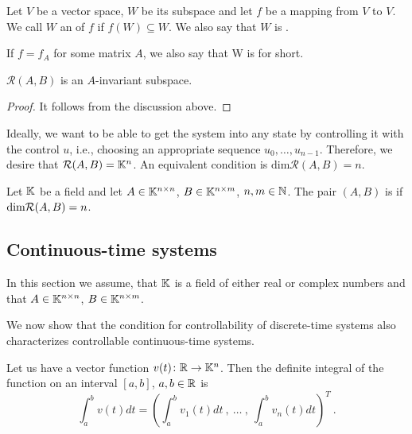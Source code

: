 \begin{definition}
	Let $V$ be a vector space, $W$ be its subspace and let $f$ be a mapping from $V$ to $V$. We call $W$ an  of $f$ if $f(W)\subseteq W$. We also say that $W$ is . 
	
	If $f=f_A$ for some matrix $A$, we also say that W is  for short.
\end{definition}

\begin{lemma}
	\label{lem:reachinv}
	$\mathcal{R}(A,B)$ is an $A$-invariant subspace.
\end{lemma} 

\begin{proof}
	It follows from the discussion above.
\end{proof}

Ideally, we want to be able to get the system into any state by controlling it with the control $u$, i.e., choosing an appropriate sequence $u_0,\ldots,u_{n-1}$. Therefore, we desire that $\mathcal{R}(A,B)=\mathbb{K}^n$. An equivalent condition is $\text{dim}\mathcal{R}(A,B)=n$.

\begin{definition}
	Let $\mathbb{K}$ be a field and let $A \in \mathbb{K}^{n \times n}$, $B \in \mathbb{K}^{n \times m}$, $n,m \in \mathbb{N}$. The pair $(A,B)$ is  if $\textnormal{dim}\mathcal{R}(A,B)=n$.
\end{definition}

\subsection{Continuous-time systems}
\label{subsec:ct-system}

\begin{remark}
	In this section we assume, that $\mathbb{K}$ is a field of either real or complex numbers and that $A\in\mathbb{K}^{n\times n}$, $B\in\mathbb{K}^{n\times m}$.
\end{remark}

We now show that the condition for controllability of discrete-time systems also characterizes controllable continuous-time systems.

\begin{definition}
	Let us have a vector function $v(t)\colon\mathbb{R}\to\mathbb{K}^n$. Then the definite integral of the function on an interval $[a,b]$, $a,b\in\mathbb{R}$ is
	$$\int_a^bv(t)dt=\left(\int_a^bv_1(t)dt\ ,\ \ldots\ ,\ \int_a^bv_n(t)dt\right)^T\ .$$
\end{definition}


